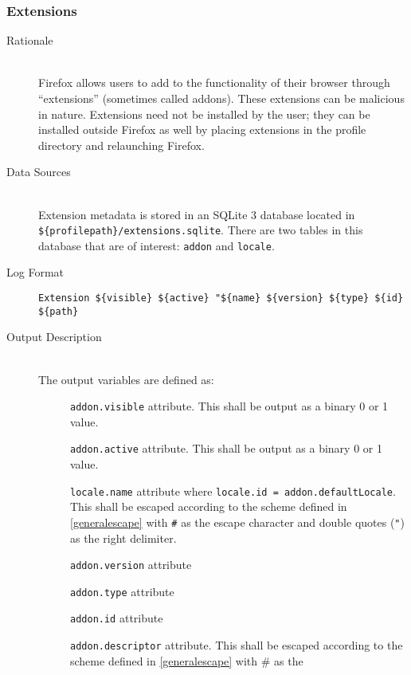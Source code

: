 \subsubsection{Extensions}
\begin{description}
\item[Rationale] \hfill \\
Firefox allows users to add to the functionality of their browser through
``extensions'' (sometimes called addons).  These extensions can be malicious in
nature.  Extensions need not be installed by the user; they can be installed
outside Firefox as well by placing extensions in the profile directory and
relaunching Firefox.  
\item[Data Sources] \hfill \\
Extension metadata is stored in an SQLite 3 database located in \\
\verb|${profilepath}/extensions.sqlite|.  There are two tables in this database
that are of interest: \verb|addon| and \verb|locale|.  
\item[Log Format] \hfill 
\vspace{-\baselineskip}
\begin{verbatim}
Extension ${visible} ${active} "${name} ${version} ${type} ${id} ${path}
\end{verbatim}
\item[Output Description] \hfill \\
The output variables are defined as:
\begin{description}
  \item[] \verb|addon.visible| attribute.  This shall be output as
  a binary 0 or 1 value.
  \item[] \verb|addon.active| attribute.  This shall be output as a
  binary 0 or 1 value.
  \item[] \verb|locale.name| attribute where \texttt{locale.id =
  addon.defaultLocale}.  This shall be escaped according to the scheme defined
  in \ref{generalescape} with \verb|#| as the escape character and double quotes
  (\verb|"|) as the right delimiter.
  \item[] \verb|addon.version| attribute
  \item[] \verb|addon.type| attribute
  \item[] \verb|addon.id| attribute
  \item[] \verb|addon.descriptor| attribute.  This shall be escaped
  according to the scheme defined in \ref{generalescape} with \# as the

\end{description}
\end{description}
